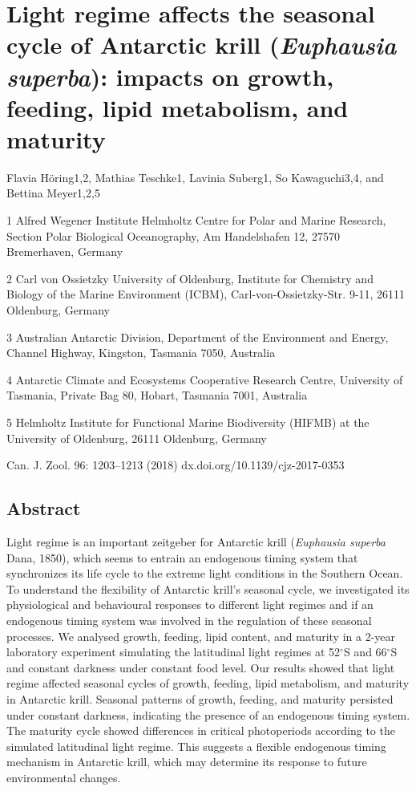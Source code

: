 \chapter[Publication 2]{Light regime affects the seasonal cycle of Antarctic krill (\textit{Euphausia superba}): impacts on growth, feeding, lipid metabolism, and maturity}

Flavia Höring1,2, Mathias Teschke1, Lavinia Suberg1, So Kawaguchi3,4, and Bettina Meyer1,2,5

1 Alfred Wegener Institute Helmholtz Centre for Polar and Marine Research, Section Polar Biological Oceanography, Am Handelshafen 12, 27570 Bremerhaven, Germany

2 Carl von Ossietzky University of Oldenburg, Institute for Chemistry and Biology of the Marine Environment (ICBM), Carl-von-Ossietzky-Str. 9-11, 26111 Oldenburg, Germany

3 Australian Antarctic Division, Department of the Environment and Energy, Channel Highway, Kingston, Tasmania 7050, Australia

4 Antarctic Climate and Ecosystems Cooperative Research Centre, University of Tasmania, Private Bag 80, Hobart, Tasmania 7001, Australia

5 Helmholtz Institute for Functional Marine Biodiversity (HIFMB) at the University of Oldenburg, 26111 Oldenburg, Germany 

Can. J. Zool. 96: 1203–1213 (2018) dx.doi.org/10.1139/cjz-2017-0353 

\section{Abstract}
Light regime is an important zeitgeber for Antarctic krill (\textit{Euphausia
superba} Dana, 1850), which seems to entrain an endogenous timing system that
synchronizes its life cycle to the extreme light conditions in the Southern
Ocean. To understand the flexibility of Antarctic krill’s seasonal cycle, we
investigated its physiological and behavioural responses to different light
regimes and if an endogenous timing system was involved in the regulation of
these seasonal processes. We analysed growth, feeding, lipid content, and
maturity in a 2-year laboratory experiment simulating the latitudinal light
regimes at 52$^{\circ}$S and 66$^{\circ}$S and constant darkness under constant
food level. Our results showed that light regime affected seasonal cycles of
growth, feeding, lipid metabolism, and maturity in Antarctic krill. Seasonal
patterns of growth, feeding, and maturity persisted under constant darkness,
indicating the presence of an endogenous timing system. The maturity cycle
showed differences in critical photoperiods according to the simulated
latitudinal light regime. This suggests a flexible endogenous timing mechanism
in Antarctic krill, which may determine its response to future environmental
changes.


